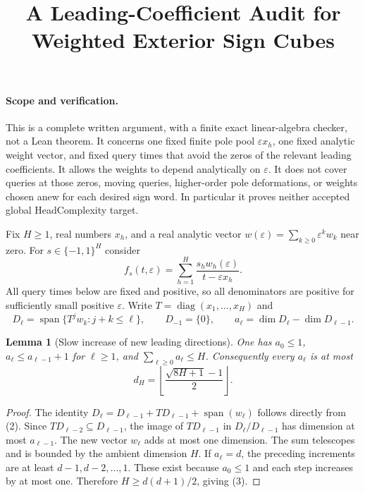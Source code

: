 \documentclass[11pt]{article}
\title{A Leading-Coefficient Audit for Weighted Exterior Sign Cubes}
\author{}
\date{}
\newtheorem{lemma}{Lemma}
\begin{document}
\maketitle

\paragraph{Scope and verification.}
This is a complete written argument, with a finite exact linear-algebra
checker, not a Lean theorem. It concerns one fixed finite pole pool
$\varepsilon x_h$, one fixed analytic weight vector, and fixed query
times that avoid the zeros of the relevant leading coefficients.
It allows the weights to depend analytically on $\varepsilon$.
It does not cover queries at those zeros, moving queries, higher-order
pole deformations, or weights chosen anew for each desired sign word.
In particular it proves neither accepted global HeadComplexity target.

Fix $H\geq1$, real numbers $x_h$, and a real analytic vector
$w(\varepsilon)=\sum_{k\geq0}\varepsilon^k w_k$ near zero. For
$s\in\{-1,1\}^H$ consider
\[
 f_s(t,\varepsilon)=\sum_{h=1}^H
       \frac{s_h w_h(\varepsilon)}{t-\varepsilon x_h}.
 \tag{1}
\]
All query times below are fixed and positive, so all denominators are
positive for sufficiently small positive $\varepsilon$.
Write $T=\operatorname{diag}(x_1,\ldots,x_H)$ and
\[
 D_\ell=\operatorname{span}\{T^j w_k:j+k\leq\ell\},
 \qquad D_{-1}=\{0\},\qquad
 a_\ell=\dim D_\ell-\dim D_{\ell-1}.
 \tag{2}
\]

\begin{lemma}[Slow increase of new leading directions]
One has $a_0\leq1$, $a_\ell\leq a_{\ell-1}+1$ for $\ell\geq1$,
and $\sum_{\ell\geq0}a_\ell\leq H$. Consequently every $a_\ell$ is
at most
\[
 d_H=\left\lfloor\frac{\sqrt{8H+1}-1}{2}\right\rfloor.
 \tag{3}
\]
\end{lemma}
\begin{proof}
The identity
$D_\ell=D_{\ell-1}+TD_{\ell-1}+\operatorname{span}(w_\ell)$
follows directly from (2). Since $TD_{\ell-2}\subseteq D_{\ell-1}$,
the image of $TD_{\ell-1}$ in $D_\ell/D_{\ell-1}$ has dimension at
most $a_{\ell-1}$. The new vector $w_\ell$ adds at most one dimension.
The sum telescopes and is bounded by the ambient dimension $H$.
If $a_\ell=d$, the preceding increments are at least
$d-1,d-2,\ldots,1$. These exist because $a_0\leq1$ and each step
increases by at most one. Therefore $H\geq d(d+1)/2$, giving (3).
\end{proof}
\end{document}
